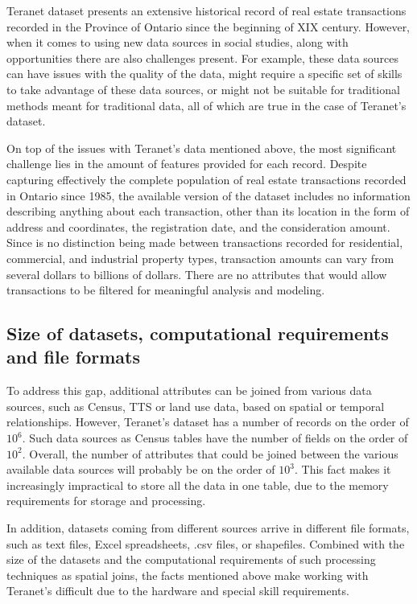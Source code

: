 Teranet dataset presents an extensive historical record of real estate transactions recorded in the Province of Ontario since the beginning of XIX century.
However, when it comes to using new data sources in social studies, along with opportunities there are also challenges present.
For example, these data sources can have issues with the quality of the data, might require a specific set of skills to take advantage of these data sources, or might not be suitable for traditional methods meant for traditional data\cite{Arribas-Bel2014}, all of which are true in the case of Teranet's dataset.

On top of the issues with Teranet's data mentioned above, the most significant challenge lies in the amount of features provided for each record.
Despite capturing effectively the complete population of real estate transactions recorded in Ontario since 1985, the available version of the dataset includes no information describing anything about each transaction, other than its location in the form of address and coordinates, the registration date, and the consideration amount.
Since is no distinction being made between transactions recorded for residential, commercial, and industrial property types, transaction amounts can vary from several dollars to billions of dollars.
There are no attributes that would allow transactions to be filtered for meaningful analysis and modeling.

\subsection{Size of datasets, computational requirements and file formats} \label{subsec:challenges_size_and_formats}

To address this gap, additional attributes can be joined from various data sources, such as Census, TTS or land use data, based on spatial or temporal relationships.
However, Teranet's dataset has a number of records on the order of $10^6$.
Such data sources as Census tables have the number of fields on the order of $10^2$.
Overall, the number of attributes that could be joined between the various available data sources will probably be on the order of $10^3$.
This fact makes it increasingly impractical to store all the data in one table, due to the memory requirements for storage and processing.

In addition, datasets coming from different sources arrive in different file formats, such as text files, Excel spreadsheets, .csv files, or shapefiles.
Combined with the size of the datasets and the computational requirements of such processing techniques as spatial joins, the facts mentioned above make working with Teranet's difficult due to the hardware and special skill requirements.

